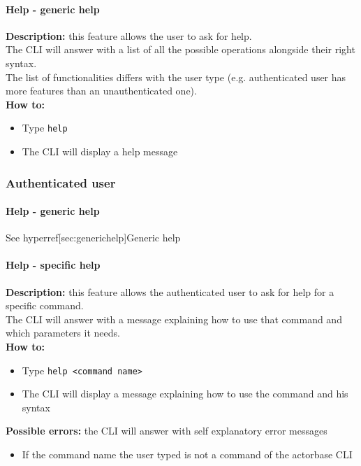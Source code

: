 \documentclass{scalatekids-article}
\begin{document}
\paragraph{Help - generic help}
\label{sec:generichelp}
\textbf{Description:} this feature allows the user to ask for help.\\
The CLI will answer with a list of all the possible operations alongside
their right syntax.\\
The list of functionalities differs with the user type (e.g. authenticated user has more features than an unauthenticated one).\\
\textbf{How to:}
\begin{itemize}
\item Type \texttt{help}
\item The CLI will display a help message
\end{itemize}

\subsubsection{Authenticated user}
\label{sec:authenticateduser}

\paragraph{Help - generic help}

See hyperref[sec:generichelp]{Generic help}

\paragraph{Help - specific help}
\label{sec:specifichelp}
\textbf{Description:} this feature allows the authenticated user to ask for help for
a specific command.\\
The CLI will answer with a message explaining how to use that command and
which parameters it needs.\\
\textbf{How to:}
\begin{itemize}
\item Type \texttt{help <command name>}
\item The CLI will display a message explaining how to use the command and his syntax
\end{itemize}
\textbf{Possible errors:} the CLI will answer with self explanatory error messages
\begin{itemize}
\item If the command name the user typed is not a command of the actorbase CLI
\end{itemize}
\end{document}
